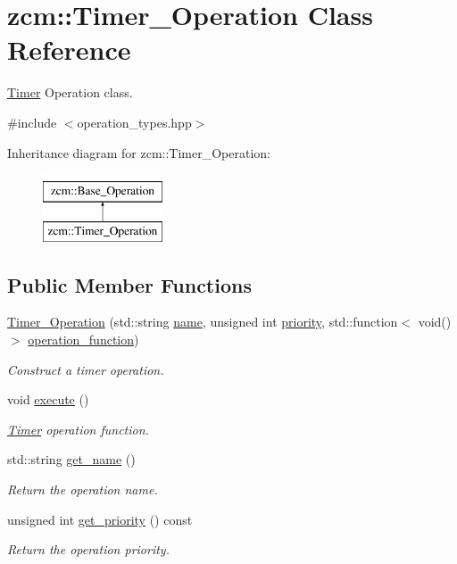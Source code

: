 \hypertarget{classzcm_1_1Timer__Operation}{}\section{zcm\+:\+:Timer\+\_\+\+Operation Class Reference}
\label{classzcm_1_1Timer__Operation}


\hyperlink{classzcm_1_1Timer}{Timer} Operation class.  




{\ttfamily \#include $<$operation\+\_\+types.\+hpp$>$}

Inheritance diagram for zcm\+:\+:Timer\+\_\+\+Operation\+:\begin{figure}[H]
\begin{center}
\leavevmode
\includegraphics[height=2.000000cm]{classzcm_1_1Timer__Operation}
\end{center}
\end{figure}
\subsection*{Public Member Functions}
\begin{DoxyCompactItemize}
\item 
\hyperlink{classzcm_1_1Timer__Operation_aa578839e1aaf755f92170f20865a5740}{Timer\+\_\+\+Operation} (std\+::string \hyperlink{classzcm_1_1Base__Operation_a2e2192550818d8f063fc7b2c76c5e21c}{name}, unsigned int \hyperlink{classzcm_1_1Base__Operation_a38af3bcc2578ef215772d595bf3fa358}{priority}, std\+::function$<$ void()$>$ \hyperlink{classzcm_1_1Timer__Operation_a492e0ec6be1dfa846bbc83d9e5dea9b0}{operation\+\_\+function})
\begin{DoxyCompactList}\small\item\em Construct a timer operation. \end{DoxyCompactList}\item 
void \hyperlink{classzcm_1_1Timer__Operation_a3693312c4d4d106d0894bb35094efda7}{execute} ()
\begin{DoxyCompactList}\small\item\em \hyperlink{classzcm_1_1Timer}{Timer} operation function. \end{DoxyCompactList}\item 
std\+::string \hyperlink{classzcm_1_1Base__Operation_a46b6a3f23e18bc35425ec2dab80c849f}{get\+\_\+name} ()
\begin{DoxyCompactList}\small\item\em Return the operation name. \end{DoxyCompactList}\item 
unsigned int \hyperlink{classzcm_1_1Base__Operation_a3b15b35c31ed173d2abb193e9fba32ef}{get\+\_\+priority} () const 
\begin{DoxyCompactList}\small\item\em Return the operation priority. \end{DoxyCompactList}\end{DoxyCompactItemize}
